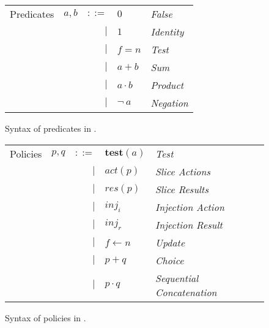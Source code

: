 \documentclass[sigconf,usenames,dvipsnames,svgnames,table]{acmart}
\begin{document}
        \begin{figure}
          \centering
          \begin{tabular}{l c r l l}
            Predicates  & $a,b$ & $::=$  & $0$         & \textit{False}    \\
                        &       & $\mid$ & $1$         & \textit{Identity} \\
                        &       & $\mid$ & $f=n$       & \textit{Test}     \\  
                        &       & $\mid$ & $a + b$     & \textit{Sum}      \\
                        &       & $\mid$ & $a \cdot b$ & \textit{Product}  \\
                        &       & $\mid$ & $\neg \ a$  & \textit{Negation}
          \end{tabular}
          \caption{Syntax of predicates in \oldname.}
          \label{fig:garuda:synt:pred}
        \end{figure}
        
        \begin{figure}
          \centering
          \begin{tabular}{l c r l l}
            Policies    & $p,q$ & $::=$  & $\mathbf{test}(a)$ & \textit{Test}     \\
                        &       & $\mid$ & $act(p)$           & \textit{Slice Actions}    \\
                        &       & $\mid$ & $res(p)$           & \textit{Slice Results}    \\
                        &       & $\mid$ & $inj_{i}$          & \textit{Injection Action} \\
                        &       & $\mid$ & $inj_{r}$          & \textit{Injection Result} \\
                        &       & $\mid$ & $f \leftarrow n$   & \textit{Update}   \\
                        &       & $\mid$ & $p + q$            & \textit{Choice}   \\
                        &       & $\mid$ & $p \cdot q$        & \textit{Sequential Concatenation}
          \end{tabular}
          \caption{Syntax of policies in \oldname.}
          \label{fig:garuda:synt:pol}
        \end{figure}
        
\end{document}
